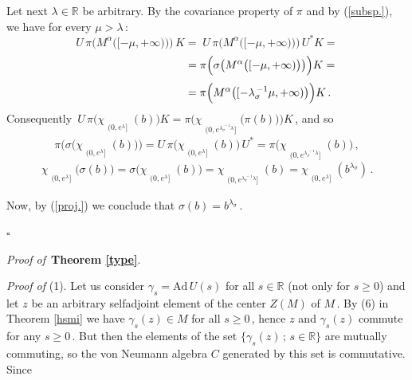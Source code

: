 \documentclass[reqno]{amsart}
\theoremstyle{definition}
\theoremstyle{remark}
\numberwithin{equation}{section}
\theoremstyle{plain}
\begin{document}
Let next $\lambda\in\mathbb R$ be arbitrary. By the covariance
property of $\pi$ and by (\ref{subsp.}), we have for every
$\mu >\lambda\,$:
\begin{equation*}
U\,\pi \big( M^\alpha \big( [-\mu ,+\infty )\big)\big)\, K =\;
U\,\pi \big( M^\alpha \big( [-\mu ,+\infty )\big)\big)\, U^*K =
\end{equation*}
\begin{equation*} \hspace{3.45 cm}
= \pi\Big( \sigma \big( M^\alpha \big( [-\mu ,+\infty )\big)
\big)\Big) K =
\end{equation*}
\begin{equation*} \hspace{3.32 cm}
= \pi\Big( M^\alpha \big( [-\lambda_\sigma^{\, -1}\mu ,+\infty )
\big)\Big) K\, .
\end{equation*}
Consequently
$\, U\,\pi\big(\chi_{\substack{{}\\{(0,e^{\lambda} ]}}}
(b)\big) K = \pi\big(
\chi_{\substack{{}\\{(0,e^{\lambda_\sigma^{\, -1}\lambda} ]}}}
\big(\pi (b)\big)\big) K\,$, and so
\begin{equation*}
\pi\big( \sigma\big(\chi_{\substack{{}\\{(0,e^{\lambda} ]}}}
(b)\big)\big) =
U\,\pi\big(\chi_{\substack{{}\\{(0,e^{\lambda} ]}}}
(b)\big)\, U^* =\pi\big(
\chi_{\substack{{}\\{(0,e^{\lambda_\sigma^{\, -1}\lambda} ]}}}
(b)\big)\, ,
\end{equation*}
\begin{equation}\label{proj.}
\chi_{\substack{{}\\{(0,e^{\lambda} ]}}} \big(\sigma (b)\big) =
\sigma\big(\chi_{\substack{{}\\{(0,e^{\lambda} ]}}} (b)\big) =
\chi_{\substack{{}\\{(0,e^{\lambda_\sigma^{\, -1}\lambda} ]}}}(b)
=\chi_{\substack{{}\\{(0,e^{\lambda} ]}}} (b^{\lambda_\sigma})\, .
\end{equation}
\smallskip

Now, by (\ref{proj.}) we conclude that
$\sigma (b) =b^{\lambda_\sigma}\,$.

\hfill $\square\quad$
\medskip

{\it Proof of }$\,${\bf Theorem \ref{type}}.
\medskip

{\it Proof of }(1).
Let us consider $\gamma_s =\text{Ad}\, U(s)$ for all
$s\in\mathbb R$ (not only for $s\geq 0$) and let $z$ be an
arbitrary selfadjoint element of the center $Z(M)$ of $M\,$.
By (6) in Theorem \ref{hsmi} we have $\gamma_s (z)\in M$ for all
$s\geq 0\,$, hence $z$ and $\gamma_s (z)$ commute for any
$s\geq 0\,$. But then the elements of the set $\{ \gamma_s (z)
\, ;\, s\in\mathbb R \}$ are mutually commuting, so the von
Neumann algebra $C$ generated by this set is commutative.
Since
\smallskip
\end{document}
